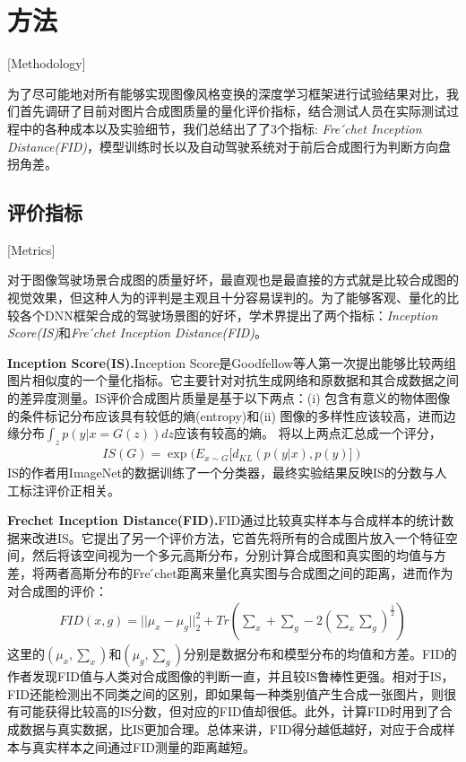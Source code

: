
\chapter{方法}[Methodology]

为了尽可能地对所有能够实现图像风格变换的深度学习框架进行试验结果对比，我们首先调研了目前对图片合成图质量的量化评价指标，结合测试人员在实际测试过程中的各种成本以及实验细节，我们总结出了了3个指标: \textit{Fre ́chet Inception Distance(FID)}\cite{FID}，模型训练时长以及自动驾驶系统对于前后合成图行为判断方向盘拐角差。

\section{评价指标}[Metrics]

对于图像驾驶场景合成图的质量好坏，最直观也是最直接的方式就是比较合成图的视觉效果，但这种人为的评判是主观且十分容易误判的。为了能够客观、量化的比较各个DNN框架合成的驾驶场景图的好坏，学术界提出了两个指标：\textit{Inception Score(IS)}\cite{IS}和\textit{Fre ́chet Inception Distance(FID)}\cite{FID}。

\textbf{Inception Score(IS).\cite{IS}}\quad Inception Score是Goodfellow等人第一次提出能够比较两组图片相似度的一个量化指标。它主要针对对抗生成网络和原数据和其合成数据之间的差异度测量。IS评价合成图片质量是基于以下两点：(i) 包含有意义的物体图像的条件标记分布应该具有较低的熵(entropy)和(ii) 图像的多样性应该较高，进而边缘分布$\int_z p(y|x=G(z))dz$应该有较高的熵。
将以上两点汇总成一个评分，
\begin{gather}
    IS(G)=\exp{(E_{x\sim G}[d_{KL}(p(y|x), p(y)])}
\end{gather}
IS的作者用ImageNet\cite{ImageNet}的数据训练了一个分类器，最终实验结果反映IS的分数与人工标注评价正相关。

\textbf{Frechet Inception Distance(FID).\cite{FID}}\quad FID通过比较真实样本与合成样本的统计数据来改进IS。它提出了另一个评价方法，它首先将所有的合成图片放入一个特征空间，然后将该空间视为一个多元高斯分布，分别计算合成图和真实图的均值与方差，将两者高斯分布的Fre ́chet距离来量化真实图与合成图之间的距离，进而作为对合成图的评价：
\begin{gather}
    FID(x,g)=||\mu_x-\mu_g||_2^2+Tr(\sum_x + \sum_g - 2(\sum_x\sum_g)^{\frac{1}{2}})
\end{gather}
这里的$(\mu_x,\sum_x)$和$(\mu_g,\sum_g)$分别是数据分布和模型分布的均值和方差。FID的作者发现FID值与人类对合成图像的判断一直，并且较IS\cite{IS}鲁棒性更强。相对于IS，FID还能检测出不同类之间的区别，即如果每一种类别值产生合成一张图片，则很有可能获得比较高的IS分数，但对应的FID值却很低。此外，计算FID时用到了合成数据与真实数据，比IS更加合理。总体来讲，FID得分越低越好，对应于合成样本与真实样本之间通过FID测量的距离越短。

